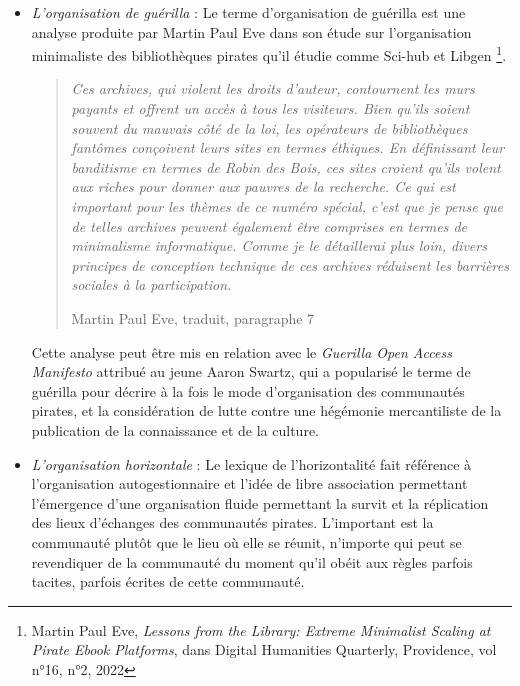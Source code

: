 \begin{itemize}
    \item \textit{L'organisation de guérilla} : Le terme d'organisation de guérilla est une analyse produite par Martin Paul Eve dans son étude sur l'organisation minimaliste des bibliothèques pirates qu'il étudie comme Sci-hub et Libgen \footnote{Martin Paul Eve, \textit{Lessons from the Library: Extreme Minimalist Scaling at Pirate Ebook Platforms}, dans Digital Humanities Quarterly, Providence, vol n°16, n°2, 2022}. 

    \begin{quote}
         \textit{\og Ces archives, qui violent les droits d'auteur, contournent les murs payants et offrent un accès à tous les visiteurs. Bien qu'ils soient souvent du mauvais côté de la loi, les opérateurs de bibliothèques fantômes conçoivent leurs sites en termes éthiques. En définissant leur banditisme en termes de Robin des Bois, ces sites croient qu'ils volent aux riches pour donner aux pauvres de la recherche. Ce qui est important pour les thèmes de ce numéro spécial, c'est que je pense que de telles archives peuvent également être comprises en termes de minimalisme informatique. Comme je le détaillerai plus loin, divers principes de conception technique de ces archives réduisent les barrières sociales à la participation.\fg }

         Martin Paul Eve, traduit, paragraphe 7
    \end{quote}

    Cette analyse peut être mis en relation avec le \textit{Guerilla Open Access Manifesto} attribué au jeune Aaron Swartz, qui a popularisé le terme de guérilla pour décrire à la fois le mode d'organisation des communautés pirates, et la considération de lutte contre une hégémonie mercantiliste de la publication de la connaissance et de la culture.

    \item \textit{L'organisation horizontale} : Le lexique de l'horizontalité fait référence à l'organisation autogestionnaire et l'idée de libre association permettant l'émergence d'une organisation fluide permettant la survit et la réplication des lieux d'échanges des communautés pirates. L'important est la communauté plutôt que le lieu où elle se réunit, n'importe qui peut se revendiquer de la communauté du moment qu'il obéit aux règles parfois tacites, parfois écrites de cette communauté. 
\end{itemize}

